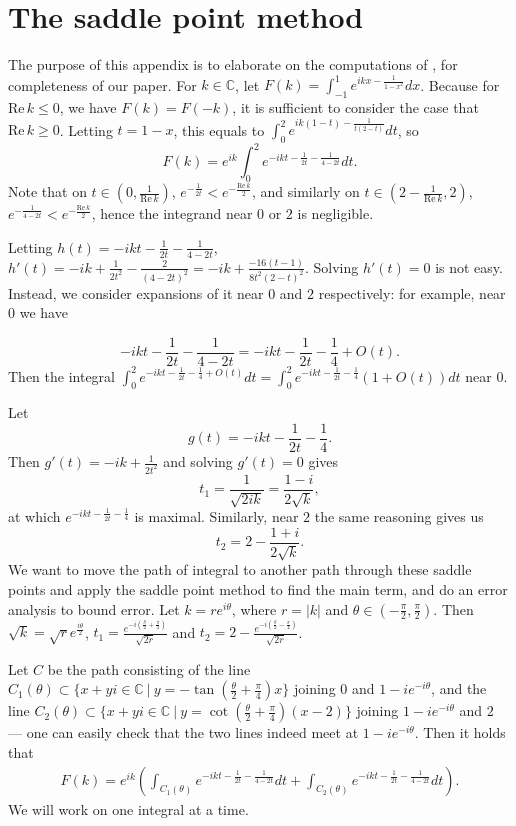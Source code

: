 \documentclass[11pt]{amsart}
\numberwithin{theorem}{section}
\numberwithin{equation}{section}
\theoremstyle{remark}
\theoremstyle{definition}
\newcommand{\C}{\mathbb{C}}
\newcommand{\re}{\mathrm{Re}\,}
\begin{document}
\newpage
\appendix

\section{The saddle point method}

The purpose of this appendix is to elaborate on the computations of \cite{Joh15}, for completeness of our paper. 
For $k \in \C$, let $F(k)=\int_{-1}^1e^{ikx-\frac{1}{1-x^2}}dx$. Because for $\re k\leq 0$, we have $F(k)=F(-k)$, it is sufficient to consider the case that $\re k\geq 0$. Letting $t=1-x$, this equals to $\int_0^2 e^{ik(1-t)-\frac{1}{t(2-t)}}dt$, so 
$$F(k)=e^{ik}\int_0^2 e^{-ikt-\frac{1}{2t}-\frac{1}{4-2t}}dt.$$
Note that on $t\in (0,\frac{1}{\re k})$, $e^{-\frac{1}{2t}}<e^{-\frac{\re k}{2}}$, and similarly on $t\in (2-\frac{1}{\re k}, 2)$, $e^{-\frac{1}{4-2t}}<e^{-\frac{\re k}{2}}$, hence the integrand near $0$ or $2$ is negligible. 

Letting $h(t)=-ikt-\frac{1}{2t}-\frac{1}{4-2t}$, $h'(t)=-ik+\frac{1}{2t^2}-\frac{2}{(4-2t)^2}=-ik+\frac{-16(t-1)}{8t^2(2-t)^2}$. Solving $h'(t)=0$ is not easy. Instead, we consider expansions of it near $0$ and $2$ respectively: for example, near $0$ we have

$$-ikt-\frac{1}{2t}-\frac{1}{4-2t}=-ikt-\frac{1}{2t}-\frac{1}{4}+O(t).$$
Then the integral $\int_0^2 e^{-ikt-\frac{1}{2t}-\frac{1}{4}+O(t)}dt= \int_0^2 e^{-ikt-\frac{1}{2t}-\frac{1}{4}}(1+O(t))dt$ near $0$. 

Let $$g(t)=-ikt-\frac{1}{2t}-\frac{1}{4}.$$ 
Then $g'(t)=-ik+\frac{1}{2t^2}$ and solving $g'(t)=0$ gives $$t_1=\frac{1}{\sqrt{2ik}}=\frac{1-i}{2\sqrt{k}},$$ at which $e^{-ikt-\frac{1}{2t}-\frac{1}{4}}$ is maximal. Similarly, near $2$ the same reasoning gives us $$t_2=2-\frac{1+i}{2\sqrt{k}}.$$ We want to move the path of integral to another path through these saddle points and apply the saddle point method to find the main term, and do an error analysis to bound error. Let $k=re^{i\theta}$, where $r=|k|$ and $\theta\in(-\frac{\pi}{2},\frac{\pi}{2})$. Then $\sqrt{k}=\sqrt{r}e^{\frac{i\theta}{2}}$, $t_1=\frac{e^{-i(\frac{\theta}{2}+\frac{\pi}{4})}}{\sqrt{2r}}$ and $t_2=2-\frac{e^{-i(\frac{\theta}{2}-\frac{\pi}{4})}}{\sqrt{2r}}$. 


Let $C$ be the path consisting of the line $C_1(\theta)\subset \{x+yi\in\mathbb{C} \ | \ y=-\tan(\frac{\theta}{2}+\frac{\pi}{4})x\} $ joining $0$ and $1-ie^{-i\theta}$, and the line $C_2(\theta)\subset \{x+yi\in\mathbb{C} \ | \ y=\cot(\frac{\theta}{2}+\frac{\pi}{4})(x-2)\} $ joining $1-ie^{-i\theta}$ and $2$ --- one can easily check that the two lines indeed meet at $1-ie^{-i\theta}$.
Then it holds that
\begin{align*}
F(k)=e^{ik}\left(\int_{C_1(\theta)}e^{-ikt-\frac{1}{2t}-\frac{1}{4-2t}}dt+\int_{C_2(\theta)} e^{-ikt-\frac{1}{2t}-\frac{1}{4-2t}}dt\right).
\end{align*}
We will work on one integral at a time.
\end{document}
